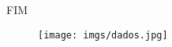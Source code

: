 \documentclass[aspectratio=169]{beamer}
\begin{document}

\begin{frame}
\Huge{\centerline{FIM}}

\begin{figure}[!h]
  \centering
  \texttt{[image: imgs/dados.jpg]}
  \label{fig_fim}
\end{figure}

\end{frame}

\end{document}
